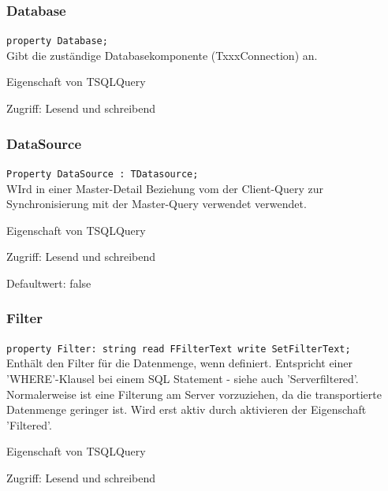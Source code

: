\subsubsection{Database}
\begin{description}
  \item \texttt{property Database;}\\Gibt die zuständige Databasekomponente (TxxxConnection) an.
  \begin{description}
    \item Eigenschaft von TSQLQuery
  \end{description}
  \begin{description}
    \item Zugriff: Lesend und schreibend
  \end{description}
\end{description}

\subsubsection{DataSource}
\begin{description}
  \item \texttt{Property DataSource : TDatasource;}\\WIrd in einer Master-Detail Beziehung vom der Client-Query zur Synchronisierung mit der Master-Query verwendet verwendet.
  \begin{description}
    \item Eigenschaft von TSQLQuery
  \end{description}
  \begin{description}
    \item Zugriff: Lesend und schreibend
    \item Defaultwert: false
  \end{description}
\end{description}

\subsubsection{Filter}
\begin{description}
  \item \texttt{property Filter: string read FFilterText write SetFilterText;}\\Enthält den Filter für die Datenmenge, wenn definiert. Entspricht einer 'WHERE'-Klausel bei einem SQL Statement - siehe auch 'Serverfiltered'. Normalerweise ist eine Filterung am Server vorzuziehen, da die transportierte Datenmenge geringer ist. 
Wird erst aktiv durch aktivieren der Eigenschaft 'Filtered'.
  \begin{description}
    \item Eigenschaft von TSQLQuery
  \end{description}
  \begin{description}
    \item Zugriff: Lesend und schreibend
  \end{description}
\end{description}

